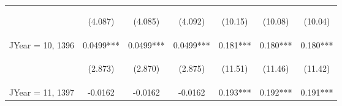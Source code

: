 \documentclass{standalone}
\begin{document}
\begin{tabular}{lcccccc}
    \vspace{4pt}     & \begin{footnotesize}(4.087)\end{footnotesize}   & \begin{footnotesize}(4.085)\end{footnotesize}   & \begin{footnotesize}(4.092)\end{footnotesize}   & \begin{footnotesize}(10.15)\end{footnotesize}  & \begin{footnotesize}(10.08)\end{footnotesize}  & \begin{footnotesize}(10.04)\end{footnotesize}  \\
    JYear = 10, 1396 & 0.0499***                                       & 0.0499***                                       & 0.0499***                                       & 0.181***                                       & 0.180***                                       & 0.180***                                       \\
    \vspace{4pt}     & \begin{footnotesize}(2.873)\end{footnotesize}   & \begin{footnotesize}(2.870)\end{footnotesize}   & \begin{footnotesize}(2.875)\end{footnotesize}   & \begin{footnotesize}(11.51)\end{footnotesize}  & \begin{footnotesize}(11.46)\end{footnotesize}  & \begin{footnotesize}(11.42)\end{footnotesize}  \\
    JYear = 11, 1397 & -0.0162                                         & -0.0162                                         & -0.0162                                         & 0.193***                                       & 0.192***                                       & 0.191***                                       \\

\end{tabular}
\end{document}
